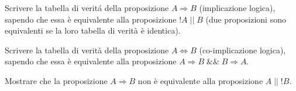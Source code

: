 \begin{Exercise}[label={ex:implicazione}]
		\Question Scrivere la tabella di verit\'a della proposizione $A \Rightarrow B$ (implicazione logica), sapendo che essa \`e equivalente alla proposizione $!A \; || \; B$ (due proposizioni sono equivalenti se la loro tabella di verit\`a \`e identica).

		\Question Scrivere la tabella di verit\`a della proposizione $A \Leftrightarrow B$ (co-implicazione logica), sapendo che essa \`e equivalente alla proposizione $A \Rightarrow B \; \&\& \; B \Rightarrow A$.
		
		\Question Mostrare che la proposizione $A \Rightarrow B$ non \`e equivalente alla proposizione $A \; || \; !B$.
\end{Exercise}

\begin{Answer}[ref={ex:implicazione}]


\end{Answer}
